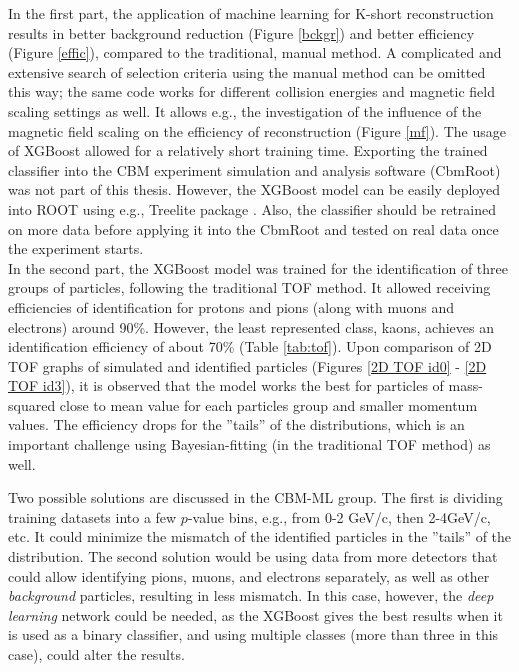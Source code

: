 \pagestyle{fancy}
\thispagestyle{fancy}
In the first part, the application of machine learning for K-short reconstruction results in better background reduction (Figure \ref{bckgr}) and better efficiency (Figure \ref{effic}), compared to the traditional, manual method. A complicated and extensive search of selection criteria using the manual method can be omitted this way; the same code works for different collision energies and magnetic field scaling settings as well. 
It allows e.g., the investigation of the influence of the magnetic field scaling on the efficiency of reconstruction (Figure \ref{mf}). 
The usage of XGBoost allowed for a relatively short training time. 
Exporting the trained classifier into the CBM experiment simulation and analysis software (CbmRoot) was not part of this thesis. 
However, the XGBoost model can be easily deployed into ROOT using e.g., Treelite package \cite{treelite}. 
Also, the classifier should be retrained on more data before applying it into the CbmRoot and tested on real data once the experiment starts.\\

In the second part, the XGBoost model was trained for the identification of three groups of particles, following the traditional TOF method. 
It allowed receiving efficiencies of identification for protons and pions (along with muons and electrons) around 90\%. 
However, the least represented class, kaons, achieves an identification efficiency of about 70\% (Table \ref{tab:tof}). Upon comparison of 2D TOF graphs of simulated and identified particles (Figures \ref{2D TOF id0} - \ref{2D TOF id3}), it is observed  that the model works the best for particles of mass-squared close to mean value for each particles group and smaller momentum values. 
The efficiency drops for the ''tails'' of the distributions, which is  an important challenge using Bayesian-fitting (in the traditional TOF method) as well. 

Two possible solutions are discussed in the CBM-ML group. The first is dividing training datasets into a few $p$-value bins, e.g., from 0-2 GeV/c, then 2-4GeV/c, etc. 
It could minimize the mismatch of the identified particles in the ''tails'' of the distribution. 
The second solution would be using data from more detectors that could allow identifying pions, muons, and electrons separately, as well as other \emph{background} particles, resulting in less mismatch. 
In this case, however, the \emph{deep learning} network could be needed, as the XGBoost gives the best results when it is used as a binary classifier, and using multiple classes 
(more than three in this case), could alter the results.\\

